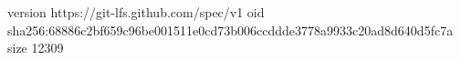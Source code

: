 version https://git-lfs.github.com/spec/v1
oid sha256:68886c2bf659c96be001511e0cd73b006ccddde3778a9933c20ad8d640d5fc7a
size 12309
